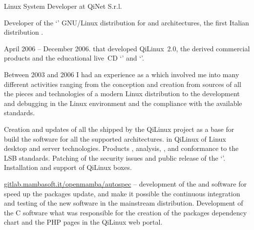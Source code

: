 %


   {Linux System Developer at QiNet S.r.l.}

Developer of the `' GNU/Linux distribution for
 and  architectures, the first Italian
distribution .

April 2006 -- December 2006. 
 that developed QiLinux~2.0, the derived commercial 
products
and the educational live~CD 
`' and `'.

Between 2003 and 2006 I had an experience as a
which involved me into many different activities ranging from the conception
and creation from sources of all the pieces and technologies of a modern Linux
distribution to the development and debugging in the Linux environment and 
the compliance with the available standards.

\smallskip\noindent
\tasks
Creation and updates of all the  shipped by the QiLinux
project as a base for build the software for all the supported architectures.
 in QiLinux of Linux desktop and server technologies.
Products ,  analysis,
, and conformance to the LSB standards.
Patching of the security issues and public release of the 
`'.
Installation and support of QiLinux boxes.

\smallskip\noindent
\software
\url{gitlab.mambasoft.it/openmamba/autospec} --
development of the  and  software for
speed up the packages update, and make it possible the continuous
integration and testing of the new software in the mainstream distribution.
Development of the C software what was responsible for the creation
of the packages dependency chart and the PHP pages in the QiLinux web portal.

